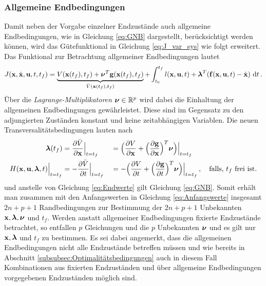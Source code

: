 \subsubsection{Allgemeine Endbedingungen}\label{subsubsec:Allg_Endbedingungen}
Damit neben der Vorgabe einzelner Endzustände auch allgemeine Endbedingungen, wie in Gleichung \eqref{eq:GNB} dargestellt, berücksichtigt werden können, wird das Gütefunktional in Gleichung \eqref{eq:J_var_sys} wie folgt erweitert. Das Funktional zur Betrachtung allgemeiner Endbedingungen lautet
\begin{equation}
J(\boldsymbol{\mathrm{x}},\dot{\boldsymbol{\mathrm{x}}},\boldsymbol{\mathrm{u}},t,t_f) = \underbrace{V(\boldsymbol{\mathrm{x}}(t_f),t_f) + \boldsymbol{\mathrm{\nu}}^T\mathbf{g}(\boldsymbol{\mathrm{x}}(t_f),t_f)}_{\bar{V}(\boldsymbol{\mathrm{x}}(t_f),t_f)} + \int_{t_0}^{t_f}l(\boldsymbol{\mathrm{x}},\boldsymbol{\mathrm{u}},t) + \boldsymbol{\mathrm{\lambda}}^T(\boldsymbol{\mathrm{f}}(\boldsymbol{\mathrm{x}},\boldsymbol{\mathrm{u}},t) - \dot{\boldsymbol{\mathrm{x}}})~\textrm{d}{t}\,. \label{eq:J_var_sys_allgemein}
\end{equation}
Über die \textit{Lagrange-Multiplikatoren} $\boldsymbol{\mathrm{\nu}}\in\mathbb{R}^p$ wird dabei die Einhaltung der allgemeinen Endbedingungen gewährleistet. Diese sind im Gegensatz zu den adjungierten Zuständen konstant und keine zeitabhängigen Variablen. Die neuen Transversalitätsbedingungen lauten nach \cite{KnutGraichen.2012}
\begin{alignat}{2}
\boldsymbol{\mathrm{\lambda}}(t_f) &= \frac{\partial \bar{V}}{\partial \boldsymbol{\mathrm{x}}}\Big|_{t=t_f} & &= \Big(\frac{\partial V}{\partial \boldsymbol{\mathrm{x}}} + \Big(\frac{\partial \mathbf{g}}{\partial \boldsymbol{\mathrm{x}}}\Big)^T\boldsymbol{\mathrm{\nu}}\Big)\Big|_{t=t_f} \label{eq:Lambdaend_allgemein} \\
H(\boldsymbol{\mathrm{x}},\boldsymbol{\mathrm{u}},\boldsymbol{\mathrm{\lambda}},t)\Big|_{t=t_f} &= - \frac{\partial \bar{V}}{\partial t}\Big|_{t=t_f} & &= -\Big(\frac{\partial V}{\partial t}+\Big(\frac{\partial \mathbf{g}}{\partial t}\Big)^T\boldsymbol{\mathrm{\nu}}\Big)\Big|_{t=t_f}\,,\quad \textrm{falls, $t_f$ frei ist.} \label{eq:Transversalitaet_allgemein}
\end{alignat}
und anstelle von Gleichung \eqref{eq:Endwerte} gilt Gleichung \eqref{eq:GNB}. Somit erhält man zusammen mit den Anfangswerten in Gleichung \eqref{eq:Anfangswerte} insgesamt $2n+p+1$ Randbedingungen zur Bestimmung der $2n+p+1$ Unbekannten $\boldsymbol{\mathrm{x}}, \boldsymbol{\mathrm{\lambda}}, \boldsymbol{\mathrm{\nu}}$ und $t_f$. Werden anstatt allgemeiner Endbedingungen fixierte Endzustände betrachtet, so entfallen $p$ Gleichungen und die $p$ Unbekannten $\boldsymbol{\mathrm{\nu}}$ und es gilt nur $\boldsymbol{\mathrm{x}}, \boldsymbol{\mathrm{\lambda}}$ und $t_f$ zu bestimmen. Es sei dabei angemerkt, dass die allgemeinen Endbedingungen nicht alle Endzustände betreffen müssen und wie bereits in Abschnitt \ref{subsubsec:Optimalitätsbedingungen} auch in diesem Fall Kombinationen aus fixierten Endzuständen und über allgemeine Endbedingungen vorgegebenen Endzuständen möglich sind. 

